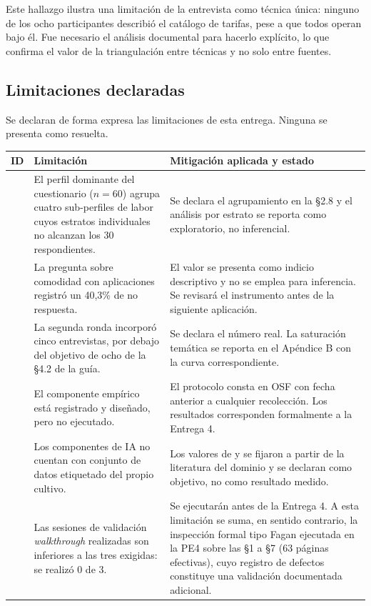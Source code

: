 Este hallazgo ilustra una limitación de la entrevista como técnica única: ninguno de los ocho
participantes describió el catálogo de tarifas, pese a que todos operan bajo él. Fue necesario el
análisis documental para hacerlo explícito, lo que confirma el valor de la triangulación entre
técnicas y no solo entre fuentes.

\subsection{Limitaciones declaradas}

Se declaran de forma expresa las limitaciones de esta entrega. Ninguna se presenta como resuelta.

\begin{longtable}{|C{1.2cm}|L{6.4cm}|L{7.4cm}|}
\hline
{}\textbf{ID} & \textbf{Limitación} & \textbf{Mitigación aplicada y estado} \\
\hline
\endhead
{} & El perfil dominante del cuestionario ($n=60$) agrupa cuatro sub-perfiles de labor cuyos estratos individuales no alcanzan los 30 respondientes. & Se declara el agrupamiento en la §2.8 y el análisis por estrato se reporta como exploratorio, no inferencial. \\ \hline
{} & La pregunta sobre comodidad con aplicaciones registró un 40{,}3\% de no respuesta. & El valor se presenta como indicio descriptivo y no se emplea para inferencia. Se revisará el instrumento antes de la siguiente aplicación. \\ \hline
{} & La segunda ronda incorporó cinco entrevistas, por debajo del objetivo de ocho de la §4.2 de la guía. & Se declara el número real. La saturación temática se reporta en el Apéndice B con la curva correspondiente. \\ \hline
{} & El componente empírico está registrado y diseñado, pero no ejecutado. & El protocolo consta en OSF con fecha anterior a cualquier recolección. Los resultados corresponden formalmente a la Entrega 4. \\ \hline
{} & Los componentes de IA no cuentan con conjunto de datos etiquetado del propio cultivo. & Los valores de  y  se fijaron a partir de la literatura del dominio \cite{suharjito2021,goh2025,rosbi2024} y se declaran como objetivo, no como resultado medido. \\ \hline
{} & Las sesiones de validación \emph{walkthrough} realizadas son inferiores a las tres exigidas: se realizó 0 de 3. & Se ejecutarán antes de la Entrega 4. A esta limitación se suma, en sentido contrario, la inspección formal tipo Fagan ejecutada en la PE4 sobre las §1 a §7 (63 páginas efectivas), cuyo registro de defectos constituye una validación documentada adicional. \\ \hline

\end{longtable}
